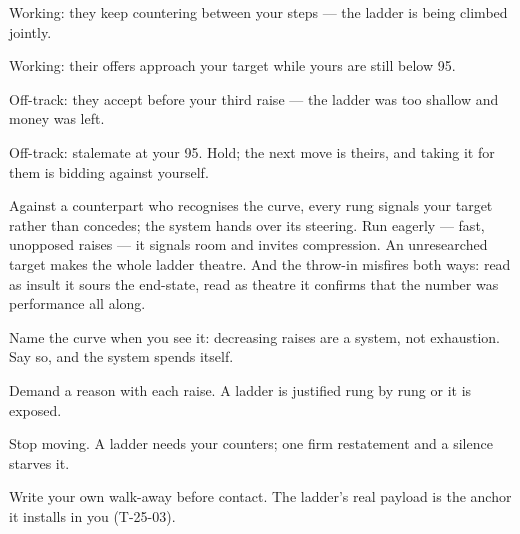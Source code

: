 \begin{feedback}
  \item Working: they keep countering between your steps --- the ladder is being climbed jointly.
  \item Working: their offers approach your target while yours are still below 95.
  \item Off-track: they accept before your third raise --- the ladder was too shallow and money was left.
  \item Off-track: stalemate at your 95. Hold; the next move is theirs, and taking it for them is bidding against yourself.
\end{feedback}
\begin{failure}
Against a counterpart who recognises the curve, every rung signals your target rather than concedes; the system hands over its steering. Run eagerly --- fast, unopposed raises --- it signals room and invites compression. An unresearched target makes the whole ladder theatre. And the throw-in misfires both ways: read as insult it sours the end-state, read as theatre it confirms that the number was performance all along.
\end{failure}
\begin{countermeasures}
  \item Name the curve when you see it: decreasing raises are a system, not exhaustion. Say so, and the system spends itself.
  \item Demand a reason with each raise. A ladder is justified rung by rung or it is exposed.
  \item Stop moving. A ladder needs your counters; one firm restatement and a silence starves it.
  \item Write your own walk-away before contact. The ladder's real payload is the anchor it installs in you (T-25-03).
\end{countermeasures}

\seesources
{}

